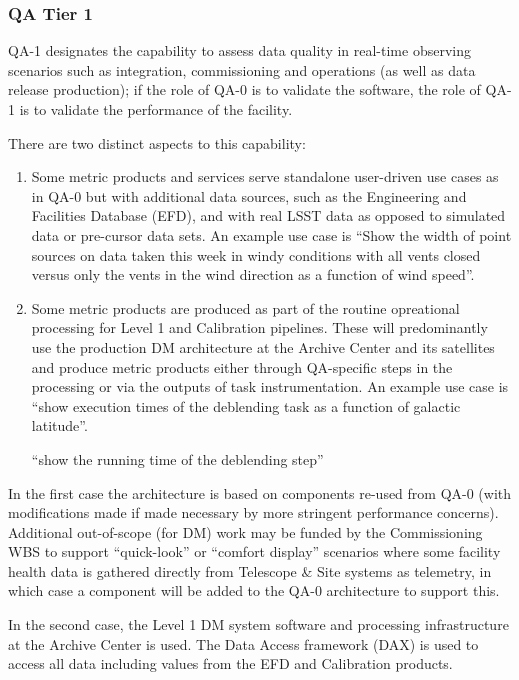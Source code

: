 \subsubsection{QA Tier 1}

QA-1 designates the capability to assess data quality in real-time observing scenarios such as integration, commissioning and operations (as well as data release production); if the role of QA-0 is to validate the software, the role of QA-1 is to validate the performance of the facility.

There are two distinct aspects to this capability:

\begin{enumerate}
\item Some metric products and services serve standalone user-driven use cases as in QA-0 but with additional data sources, such as the Engineering and Facilities Database (EFD), and with real LSST data as opposed to simulated data or pre-cursor data sets.  An example use case is ``Show the width of point sources on data taken this week in windy conditions with all vents closed versus only the vents in the wind direction as a function of wind speed''.

\item Some metric products are produced as part of the routine opreational processing for Level 1 and Calibration pipelines. These will predominantly use the production DM architecture at the Archive Center and its satellites and produce metric products either through QA-specific steps in the processing or via the outputs of task instrumentation. An example use case is ``show execution times of the deblending task as a function of galactic latitude''.



``show the running time of the deblending step'' 

\end{enumerate}

In the first case the architecture is based on components re-used from QA-0 (with modifications made if made necessary by more stringent performance concerns). Additional out-of-scope (for DM) work may be funded by the Commissioning WBS to support ``quick-look'' or ``comfort display'' scenarios where some facility health data is gathered directly from Telescope \& Site systems as telemetry, in which case a component will be added to the QA-0 architecture to support this.

In the second case, the Level 1 DM system software and processing infrastructure at the Archive Center is used. The Data Access framework (DAX) is used to access all data including values from the EFD and Calibration products.

